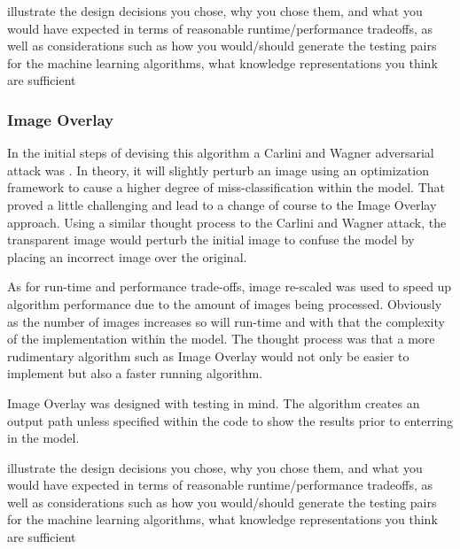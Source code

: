 \documentclass{article}
\begin{document}
illustrate the design decisions you chose, why you chose them, and what you would have expected in terms of reasonable runtime/performance tradeoffs, as well as considerations such as how you would/should generate the testing pairs for the machine learning algorithms, what knowledge representations you think are sufficient 


\subsubsection{Image Overlay}

In the initial steps of devising this algorithm a Carlini and Wagner adversarial attack was . In theory, it will slightly perturb an image using an optimization framework to cause a higher degree of miss-classification within the model. That proved a little challenging and lead to a change of course to the Image Overlay approach. Using a similar thought process to the Carlini and Wagner attack, the transparent image would perturb the initial image to confuse the model by placing an incorrect image over the original.

As for run-time and performance trade-offs, image re-scaled was used to speed up algorithm performance due to the amount of images being processed. Obviously as the number of images increases so will run-time and with that the complexity of the implementation within the model. The thought process was that a more rudimentary algorithm such as Image Overlay would not only be easier to implement but also a faster running algorithm.

Image Overlay was designed with testing in mind. The algorithm creates an output path unless specified within the code to show the results prior to enterring in the model. 




illustrate the design decisions you chose, why you chose them, and what you would have expected in terms of reasonable runtime/performance tradeoffs, as well as considerations such as how you would/should generate the testing pairs for the machine learning algorithms, what knowledge representations you think are sufficient 
\end{document}
